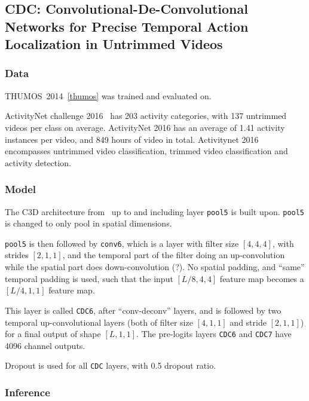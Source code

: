 \documentclass[a4paper, 12pt]{article}
\begin{document}
\subsection{CDC\@: Convolutional-De-Convolutional Networks for Precise Temporal
            Action Localization in Untrimmed
            Videos~\citet{DBLP:journals/corr/ShouCZMC17}}

\subsubsection{Data}

THUMOS~2014~\ref{thumos} was trained and evaluated on.

ActivityNet challenge 2016~\citet{Heilbron_2015_CVPR} has 203 activity
categories, with 137 untrimmed videos per class on average. ActivityNet 2016
has an average of 1.41 activity instances per video, and 849 hours of video in
total. Activitynet 2016 encompasses untrimmed video classification, trimmed
video classification and activity detection.

\subsubsection{Model}

The C3D architecture
from~\citet{DBLP:journals/corr/TranBFTP15, DBLP:journals/corr/TranBFTP14} up to
and including layer \verb|pool5| is built upon. \verb|pool5| is changed to only
pool in spatial dimensions.

\verb|pool5| is then followed by \verb|conv6|, which is a layer with filter
size $[4, 4, 4]$, with strides $[2, 1, 1]$, and the temporal part of the filter
doing an up-convolution while the spatial part does down-convolution (?). No
spatial padding, and ``same'' temporal padding is used, such that the input
$[L/8, 4, 4]$ feature map becomes a $[L/4, 1, 1]$ feature map.

This layer is called \verb|CDC6|, after ``conv-deconv'' layers, and is followed
by two temporal up-convolutional layers (both of filter size $[4, 1, 1]$ and
stride $[2, 1, 1]$) for a final output of shape $[L, 1, 1]$.  The pre-logits
layers \verb|CDC6| and \verb|CDC7| have 4096 channel outputs.

Dropout is used for all \verb|CDC| layers, with 0.5 dropout ratio.

\subsubsection{Inference}
\end{document}
